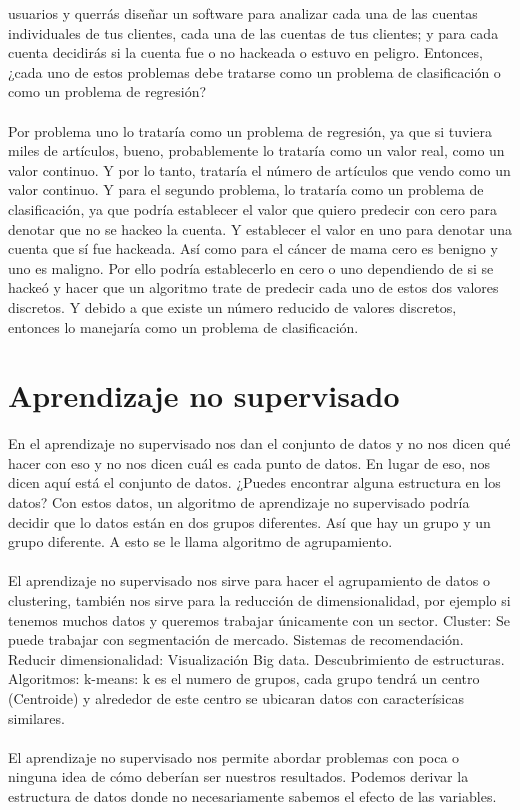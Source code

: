 \documentclass{report}
\begin{document}
usuarios y querrás diseñar un software para analizar cada una de las
cuentas individuales de tus clientes, cada una de las cuentas de tus clientes; y para cada cuenta
decidirás si la cuenta fue o no hackeada o estuvo en peligro. Entonces, ¿cada uno
de estos problemas debe tratarse como un problema de clasificación o
como un problema de regresión? \\\\ Por problema uno lo trataría como un
problema de regresión, ya que si tuviera miles de artículos, bueno,
probablemente lo trataría como un valor real, como un valor continuo. Y
por lo tanto, trataría el número de artículos que vendo como un valor continuo. Y para el
segundo problema, lo trataría como un problema de clasificación, ya que podría
establecer el valor que quiero predecir con cero para denotar que no se hackeo
la cuenta. Y establecer el valor en uno para denotar una cuenta que sí fue hackeada. Así
como para el cáncer de mama cero es benigno y uno es maligno. Por ello
podría establecerlo en cero o uno dependiendo de si se hackeó y hacer que un
algoritmo trate de predecir cada uno de estos dos valores discretos. Y debido a que existe
un número reducido de valores discretos, entonces lo manejaría como un problema de
clasificación.
\newpage
\section{Aprendizaje no supervisado}
En el aprendizaje no supervisado nos dan el conjunto de datos
y no nos dicen qué
hacer con eso y no nos
dicen cuál es cada punto de datos.
En lugar de eso, nos dicen aquí está el conjunto de datos.
¿Puedes encontrar alguna estructura en los datos?
Con estos datos, un
algoritmo de aprendizaje no supervisado podría decidir
que lo datos están en dos grupos diferentes.
Así que hay un grupo
y un grupo diferente.
A esto se le llama algoritmo de agrupamiento.\\\\
El aprendizaje no supervisado nos sirve para hacer el agrupamiento de datos o clustering, también nos sirve para la reducción de dimensionalidad, por ejemplo si tenemos muchos datos y queremos trabajar únicamente con un sector.
Cluster: Se puede trabajar con segmentación de mercado. Sistemas de recomendación.
Reducir dimensionalidad: Visualización Big data. Descubrimiento de estructuras.
Algoritmos:
k-means: k es el numero de grupos, cada grupo tendrá un centro (Centroide) y alrededor de este centro se ubicaran datos con caracterísicas similares.
\\\\
El aprendizaje no supervisado nos permite abordar problemas con poca o ninguna idea de cómo deberían ser nuestros resultados. Podemos derivar la estructura de datos donde no necesariamente sabemos el efecto de las variables.
\end{document}
